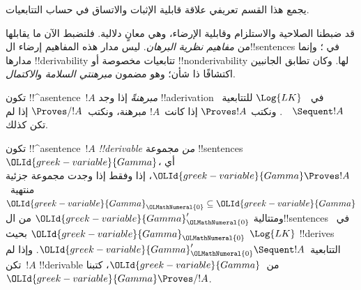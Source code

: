 \documentclass[../../../include/open-logic-section]{subfiles}
\begin{document}
\begin{editorial}
  يجمع هذا القسم تعريفي علاقة قابلية الإثبات والاتساق في حساب
  التتابعيات.
\end{editorial}

      {}
      {}


\begin{explain}
قد ضبطنا الصلاحية والاستلزام وقابلية الإرضاء، وهي معانٍ دلالية. فلنضبط الآن ما يقابلها من
\emph{مفاهيم نظرية البرهان}. ليس مدار هذه المفاهيم إرضاء ال!!{sentence}s في
؛ وإنما مدارها
!!{derivability} تتابعيات مخصوصة أو
!!{nonderivability} لها. وكان تطابق الجانبين اكتشافًا ذا شأن؛ وهو مضمون
\emph{مبرهنتي السلامة} و\emph{الاكتمال}.
\end{explain}

\begin{defn}[المبرهنات]
تكون !!^a{sentence}~$!A$ \emph{مبرهنةً} إذا وجد !!a{derivation} في
~$\Log{LK}$ للتتابعية~$\quad \Sequent !A$. ونكتب $\Proves !A$ إذا
كانت~$!A$ مبرهنة، ونكتب~$\Proves/ !A$ إذا لم تكن كذلك.
\end{defn}

\begin{defn}[!!^{derivability}]
تكون !!^a{sentence}~$!A$ \emph{!!{derivable} من} مجموعة
!!{sentence}s~$\OLId{greek-variable}{Gamma}$، أي $\OLId{greek-variable}{Gamma} \Proves !A$، إذا وفقط إذا وجدت
مجموعة جزئية منتهية~$\OLId{greek-variable}{Gamma}_\OLMathNumeral{0} \subseteq \OLId{greek-variable}{Gamma}$ ومتتالية
$\OLId{greek-variable}{Gamma}_\OLMathNumeral{0}'$ من ال!!{sentence}s في~$\OLId{greek-variable}{Gamma}_\OLMathNumeral{0}$ بحيث
$\Log{LK}$ !!{derive}s التتابعية~$\OLId{greek-variable}{Gamma}_\OLMathNumeral{0}' \Sequent !A$. وإذا لم
تكن~$!A$ !!{derivable} من~$\OLId{greek-variable}{Gamma}$، كتبنا $\OLId{greek-variable}{Gamma} \Proves/ !A$.
\end{defn}
\end{document}
